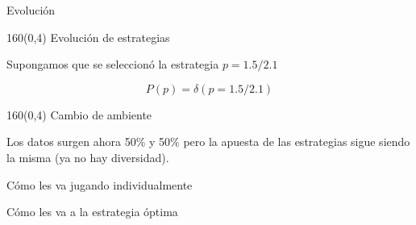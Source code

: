 \documentclass[shownotes,aspectratio=169]{beamer}
\begin{document}
\begin{frame}[plain]

\centering \Large

Evoluci\'on

\end{frame}



\begin{frame}[plain]
\begin{textblock}{160}(0,4)
\centering \Large Evolución de estrategias
\end{textblock}
\vspace{0.75cm}

\centering
{}
 \vspace{1.5cm}
 \pause
 
 Supongamos que se seleccionó la estrategia $p=1.5/2.1$

 \begin{equation}
 P(p) = \delta(p=1.5/2.1)
 \end{equation}
 
\end{frame}


\begin{frame}[plain]
\begin{textblock}{160}(0,4)
\centering \Large Cambio de ambiente
\end{textblock}
\vspace{0.75cm}

Los datos surgen ahora 50\% y 50\% pero la apuesta de las estrategias sigue siendo la misma (ya no hay diversidad).

\end{frame}

\begin{frame}[plain]

Cómo les va jugando individualmente

Cómo les va a la estrategia óptima

\end{frame}
\end{document}
